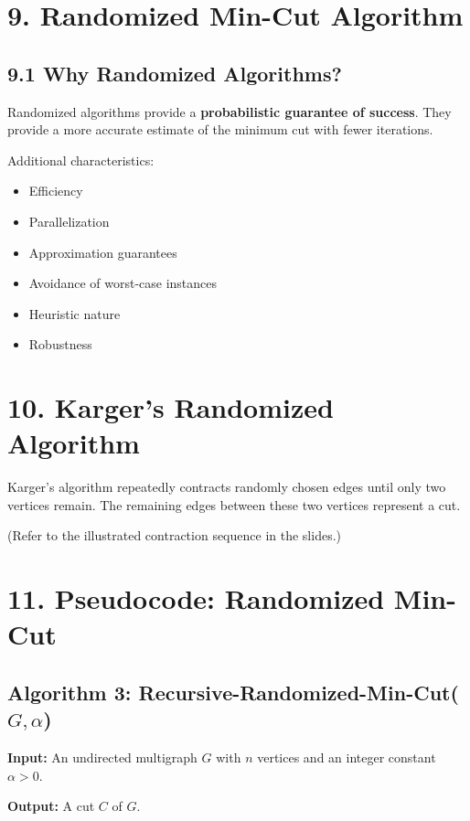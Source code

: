 \documentclass[12pt]{article}
\begin{document}
\section*{9. Randomized Min-Cut Algorithm}

\subsection*{9.1 Why Randomized Algorithms?}

Randomized algorithms provide a \textbf{probabilistic guarantee of success}.  
They provide a more accurate estimate of the minimum cut with fewer iterations.

Additional characteristics:

\begin{itemize}
    \item Efficiency
    \item Parallelization
    \item Approximation guarantees
    \item Avoidance of worst-case instances
    \item Heuristic nature
    \item Robustness
\end{itemize}

\section*{10. Karger’s Randomized Algorithm}

Karger’s algorithm repeatedly contracts randomly chosen edges until only two vertices remain. The remaining edges between these two vertices represent a cut.

(Refer to the illustrated contraction sequence in the slides.)

\section*{11. Pseudocode: Randomized Min-Cut}

\subsection*{Algorithm 3: Recursive-Randomized-Min-Cut(\(G, \alpha\))}

\textbf{Input:} An undirected multigraph \( G \) with \( n \) vertices and an integer constant \( \alpha > 0 \).

\textbf{Output:} A cut \( C \) of \( G \).
\end{document}
